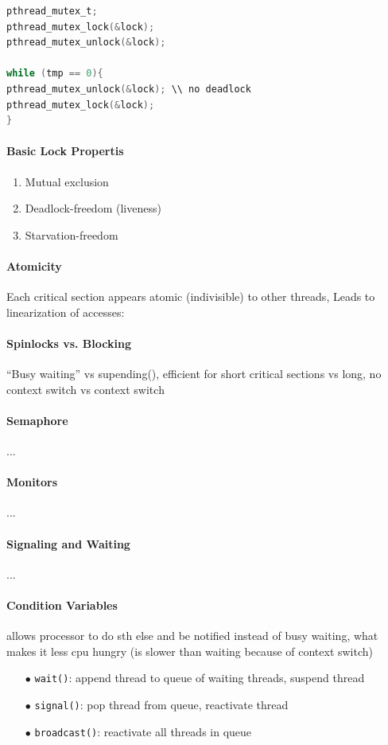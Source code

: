 \documentclass[fontsize=8pt]{scrartcl}
\begin{document}
\begin{multicols*}{4}
\begin{lstlisting}[language=c, numbers=none]
pthread_mutex_t;
pthread_mutex_lock(&lock);
pthread_mutex_unlock(&lock);

while (tmp == 0){
pthread_mutex_unlock(&lock); \\ no deadlock
pthread_mutex_lock(&lock);
}
\end{lstlisting}

\paragraph{Basic Lock Propertis}
  \begin{enumerate}
    \item Mutual exclusion
    \item Deadlock-freedom (liveness)
    \item Starvation-freedom
  \end{enumerate}

\paragraph{Atomicity}Each critical section appears atomic (indivisible) to other threads, Leads to linearization of accesses:

\paragraph{Spinlocks vs. Blocking}“Busy waiting” vs supending(), efficient for short critical sections vs long, no context switch vs context switch

\paragraph{Semaphore}...

\paragraph{Monitors}...

\paragraph{Signaling and Waiting}...

\paragraph{Condition Variables}
allows processor to do sth else and be notified instead of busy waiting, what makes it less cpu hungry (is slower than waiting because of context switch)
\begin{enumerate}
  \item[$\bullet$] \texttt{wait()}: append thread to queue of waiting threads, suspend thread
  \item[$\bullet$] \texttt{signal()}: pop thread from queue, reactivate thread
  \item[$\bullet$] \texttt{broadcast()}: reactivate all threads in queue
\end{enumerate}   


\end{multicols*}
\end{document}
